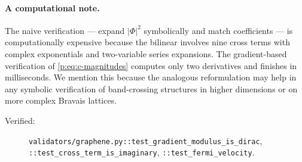 \paragraph{A computational note.}
The naive verification --- expand $\lvert\Phi\rvert^{2}$ symbolically and
match coefficients --- is computationally expensive because the bilinear
involves nine cross terms with complex exponentials and two-variable
series expansions. The gradient-based verification of
\eqref{p:eq:c-magnitudes} computes only two derivatives and finishes in
milliseconds. We mention this because the analogous reformulation may
help in any symbolic verification of band-crossing structures in higher
dimensions or on more complex Bravais lattices.
\begin{description}
\item[Verified:]
\texttt{validators/graphene.py::test\_gradient\_modulus\_is\_dirac},
\texttt{::test\_cross\_term\_is\_imaginary},
\texttt{::test\_fermi\_velocity}.
\end{description}
